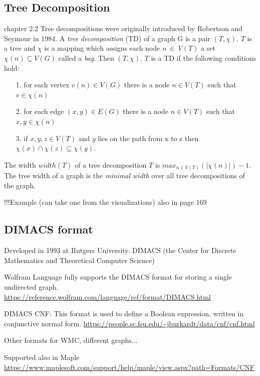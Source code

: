 \documentclass[a4paper, 12pt]{scrartcl}
\begin{document}
\subsection{Tree Decomposition}
\cite{DiplomarbeitZisser}chapter 2.2
Tree decompositions were originally introduced by Robertson and Seymour \cite{ROBERTSON198449} in 1984.
A \textit{tree decomposition} (TD) of a graph G is a pair $(T, \chi)$. $T$ is a tree and $\chi$ is a mapping which assigns each node $n~\in~V(T)$ 
a set $\chi(n) \subseteq V(G)$ called a \textit{bag}. Then $(T, \chi)$. $T$ is a TD if the following conditions hold:

\begin{itemize}
	\item[1.] for each vertex $v(n) \in V(G)$ there is a node $n \in V(T)$ such that $v \in \chi(n)$
	\item[2.] for each edge $(x,y) \in E(G)$ there is a node $n\in V(T)$ such that $x,y \in\chi(n)$
	\item[3.] if $x,y,z \in V(T)$ and $y$ lies on the path from x to z then $\chi(x) \cap \chi(z) \subseteq \chi(y)$.
\end{itemize}
The width $width(T)$ of a tree decomposition $T$ is $max_{n\in V(T)}(|\chi(n)|)-1$.
The tree width of a graph is the \textit{minimal width} over all tree decompositions of the graph.

!!!Example (can take one from the visualizations) also in \cite{pcgp2019} page 169

\subsection{DIMACS format}
Developed in 1993 at Rutgers University.
DIMACS (the Center for Discrete Mathematics and Theoretical Computer Science)

Wolfram Language fully supports the DIMACS format for storing a single undirected graph.
\url{https://reference.wolfram.com/language/ref/format/DIMACS.html}

DIMACS CNF: This format is used to define a Boolean expression, written in conjunctive normal form.
\url{https://people.sc.fsu.edu/~jburkardt/data/cnf/cnf.html}

Other formats for WMC, different graphs...

Supported also in Maple \url{https://www.maplesoft.com/support/help/maple/view.aspx?path=Formats/CNF}
\end{document}
